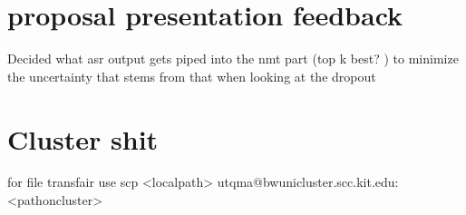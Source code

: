 \section{proposal presentation feedback}
Decided what asr output gets piped into the nmt part (top k best? ) to minimize the uncertainty that stems from that when looking at the dropout

\section{Cluster shit}

for file transfair use
scp <localpath> utqma@bwunicluster.scc.kit.edu:<pathoncluster>

